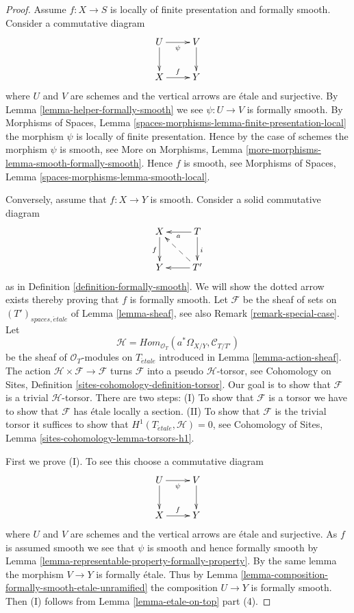 \begin{proof}
Assume $f : X \to S$ is locally of finite presentation and formally smooth.
Consider a commutative diagram
$$
\xymatrix{
U \ar[d] \ar[r]_\psi & V \ar[d] \\
X \ar[r]^f & Y
}
$$
where $U$ and $V$ are schemes and the vertical arrows are \'etale and
surjective. By
Lemma \ref{lemma-helper-formally-smooth}
we see $\psi : U \to V$ is formally smooth. By
Morphisms of Spaces, Lemma
\ref{spaces-morphisms-lemma-finite-presentation-local}
the morphism $\psi$ is locally of finite presentation.
Hence by the case of schemes the morphism
$\psi$ is smooth, see
More on Morphisms, Lemma \ref{more-morphisms-lemma-smooth-formally-smooth}.
Hence $f$ is smooth, see
Morphisms of Spaces, Lemma
\ref{spaces-morphisms-lemma-smooth-local}.

\medskip\noindent
Conversely, assume that $f : X \to Y$ is smooth.
Consider a solid commutative diagram
$$
\xymatrix{
X \ar[d]_f & T \ar[d]^i \ar[l]^a \\
Y & T' \ar[l] \ar@{-->}[lu]
}
$$
as in Definition \ref{definition-formally-smooth}.
We will show the dotted arrow exists thereby
proving that $f$ is formally smooth.
Let $\mathcal{F}$ be the sheaf of sets on $(T')_{spaces, \acute{e}tale}$ of
Lemma \ref{lemma-sheaf},
see also
Remark \ref{remark-special-case}.
Let
$$
\mathcal{H} =
\textit{Hom}_{\mathcal{O}_T}(a^*\Omega_{X/Y}, \mathcal{C}_{T/T'})
$$
be the sheaf of $\mathcal{O}_T$-modules on $T_{\acute{e}tale}$ introduced in
Lemma \ref{lemma-action-sheaf}.
The action $\mathcal{H} \times \mathcal{F} \to \mathcal{F}$
turns $\mathcal{F}$ into a pseudo $\mathcal{H}$-torsor, see
Cohomology on Sites, Definition \ref{sites-cohomology-definition-torsor}.
Our goal is to show that $\mathcal{F}$ is a trivial $\mathcal{H}$-torsor.
There are two steps: (I) To show that $\mathcal{F}$ is a torsor
we have to show that $\mathcal{F}$ has \'etale locally a
section. (II) To show that $\mathcal{F}$ is the trivial torsor
it suffices to show that $H^1(T_{\acute{e}tale}, \mathcal{H}) = 0$, see
Cohomology of Sites, Lemma \ref{sites-cohomology-lemma-torsors-h1}.

\medskip\noindent
First we prove (I). To see this choose a commutative diagram
$$
\xymatrix{
U \ar[d] \ar[r]_\psi & V \ar[d] \\
X \ar[r]^f & Y
}
$$
where $U$ and $V$ are schemes and the vertical arrows are \'etale and
surjective. As $f$ is assumed smooth we see that $\psi$ is smooth and
hence formally smooth by
Lemma \ref{lemma-representable-property-formally-property}.
By the same lemma the morphism $V \to Y$ is formally \'etale. Thus by
Lemma \ref{lemma-composition-formally-smooth-etale-unramified}
the composition $U \to Y$ is formally smooth. Then (I) follows from
Lemma \ref{lemma-etale-on-top} part (4).


\end{proof}
